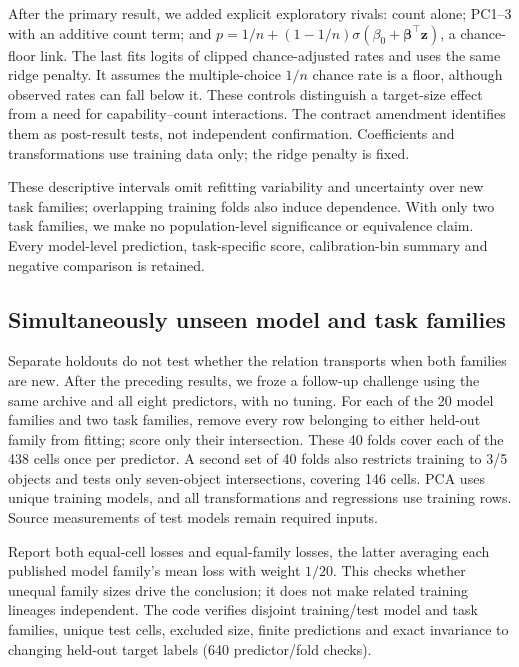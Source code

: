 After the primary result, we added explicit exploratory rivals: count alone; PC1--3 with an additive count term; and $p=1/n+(1-1/n)\sigma(\beta_0+\boldsymbol\beta^\top\mathbf z)$, a chance-floor link. The last fits logits of clipped chance-adjusted rates and uses the same ridge penalty. It assumes the multiple-choice $1/n$ chance rate is a floor, although observed rates can fall below it. These controls distinguish a target-size effect from a need for capability--count interactions. The contract amendment identifies them as post-result tests, not independent confirmation. Coefficients and transformations use training data only; the ridge penalty is fixed. 

\begin{table}[htbp]\centering\small
\caption{All descriptor-test scores, including secondary rivals. The target-family and model-family axes each contain 438 out-of-fold cells; the seven-object test contains 146.}

\end{table}



These descriptive intervals omit refitting variability and uncertainty over new task families; overlapping training folds also induce dependence. With only two task families, we make no population-level significance or equivalence claim. Every model-level prediction, task-specific score, calibration-bin summary and negative comparison is retained.

\subsection{Simultaneously unseen model and task families}
\label{app:joint}
Separate holdouts do not test whether the relation transports when both families are new. After the preceding results, we froze a follow-up challenge using the same archive and all eight predictors, with no tuning. For each of the 20 model families and two task families, remove every row belonging to either held-out family from fitting; score only their intersection. These 40 folds cover each of the 438 cells once per predictor. A second set of 40 folds also restricts training to 3/5 objects and tests only seven-object intersections, covering 146 cells. PCA uses unique training models, and all transformations and regressions use training rows. Source measurements of test models remain required inputs.

Report both equal-cell losses and equal-family losses, the latter averaging each published model family's mean loss with weight $1/20$. This checks whether unequal family sizes drive the conclusion; it does not make related training lineages independent. The code verifies disjoint training/test model and task families, unique test cells, excluded size, finite predictions and exact invariance to changing held-out target labels (640 predictor/fold checks).

